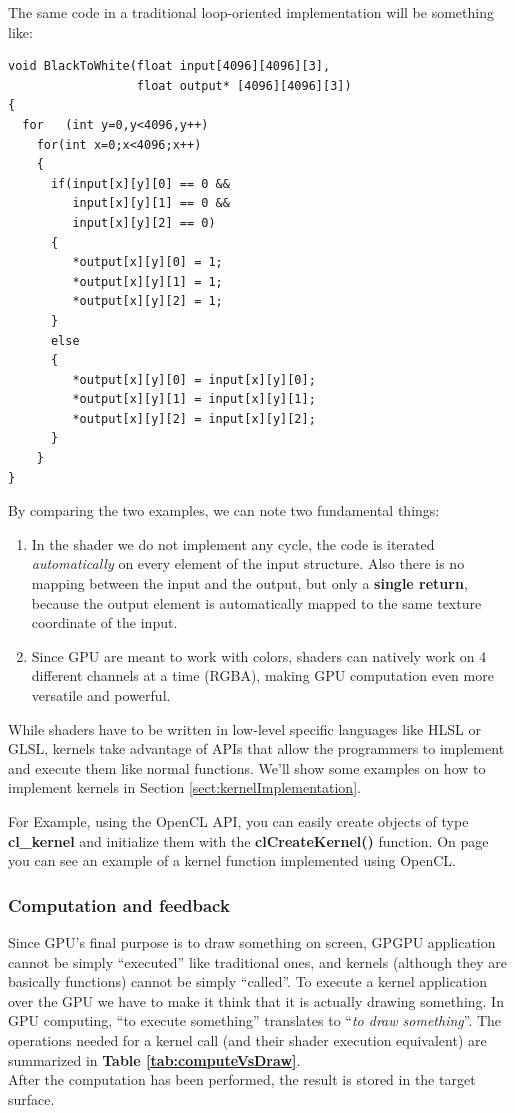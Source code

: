 The same code in a traditional loop-oriented implementation will be something like:

{\footnotesize\begin{verbatim}
void BlackToWhite(float input[4096][4096][3],
                  float output* [4096][4096][3])
{
  for	(int y=0,y<4096,y++)
    for(int x=0;x<4096;x++)
    {
      if(input[x][y][0] == 0 &&
         input[x][y][1] == 0 &&
         input[x][y][2] == 0)
      {
         *output[x][y][0] = 1;
         *output[x][y][1] = 1;
         *output[x][y][2] = 1;
      }
      else
      {
         *output[x][y][0] = input[x][y][0];
         *output[x][y][1] = input[x][y][1];
         *output[x][y][2] = input[x][y][2];
      }
    }
}
\end{verbatim}}


By comparing the two examples, we can note two fundamental things:

\begin{enumerate}
	\item In the shader we do not implement any cycle, the code is iterated \emph{automatically} on every element of the input structure. Also there is no mapping between the input and the output, but only a \textbf{single return}, because the output element is automatically mapped to the same texture coordinate of the input.
	\item Since GPU are meant to work with colors, shaders can natively work on 4 different channels at a time (RGBA), making GPU computation even more versatile and powerful.
\end{enumerate}

While shaders have to be written in low-level specific languages like HLSL or GLSL, kernels take advantage of APIs that allow the programmers to implement and execute them like normal functions. We'll show some examples on how to implement kernels in Section \ref{sect:kernelImplementation}.

\begin{CLCode}
For Example, using the OpenCL API, you can easily create objects of type \textbf{cl\_kernel} and initialize them with the \textbf{clCreateKernel()} function. On page \pageref{sect:kernelImplementation} you can see an example of a kernel function implemented using OpenCL.
\end{CLCode}


\subsubsection{Computation and feedback}
Since GPU's final purpose is to draw something on screen, GPGPU application cannot be simply ``executed'' like traditional ones, and kernels (although they are basically functions) cannot be simply ``called''. To execute a kernel application over the GPU we have to make it think that it is actually drawing something. In GPU computing, ``to execute something'' translates to ``\textit{to draw something}''.
The operations needed for a kernel call (and their shader execution equivalent) are summarized in \textbf{Table \ref{tab:computeVsDraw}}.\\
After the computation has been performed, the result is stored in the target surface.\\

